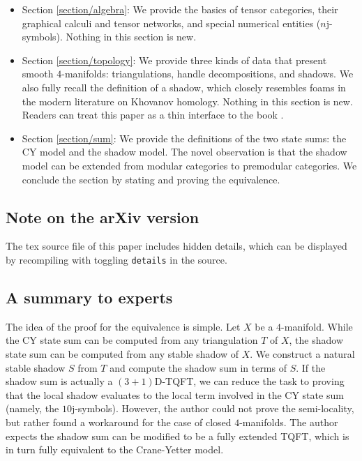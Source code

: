 \begin{itemize}
  \item Section \ref{section/algebra}: We provide the basics of tensor
        categories, their graphical calculi and tensor networks,
        and special numerical entities ($n$j-symbols). Nothing in
        this section is new.
  \item Section \ref{section/topology}: We provide three kinds of
        data that present smooth $4$-manifolds: triangulations,
        handle decompositions, and shadows. We also fully recall
        the definition of a shadow, which closely resembles foams
        in the modern literature on Khovanov homology. Nothing in
        this section is new. Readers can treat this paper as a
        thin interface to the book
        \cite{turaev-qiok-3-manifolds}.
  \item Section \ref{section/sum}: We provide the definitions of
        the two state sums: the CY model and the shadow model.
        The novel observation is that the shadow model can be
        extended from modular categories to premodular
        categories. We conclude the section by stating and
        proving the equivalence.
\end{itemize}

\subsection{Note on the arXiv version}
The tex source file of this paper includes hidden details, which
can be displayed by recompiling with toggling \texttt{details} in
the source.

\subsection{A summary to experts}\label{subsection/a-summary-to-experts}

The idea of the proof for the equivalence is simple. Let $X$ be a
$4$-manifold. While the CY state sum can be computed from any
triangulation $T$ of $X$, the shadow state sum can be computed
from any stable shadow of $X$. We construct a natural stable
shadow $S$ from $T$ and compute the shadow sum in terms of $S$.
If the shadow sum is actually a $(3+1)$D-TQFT, we can reduce the
task to proving that the local shadow evaluates to the local term
involved in the CY state sum (namely, the $10$j-symbols).
However, the author could not prove the semi-locality, but rather
found a workaround for the case of closed $4$-manifolds. The
author expects the shadow sum can be modified to be a fully
extended TQFT, which is in turn fully equivalent to the
Crane-Yetter model.

